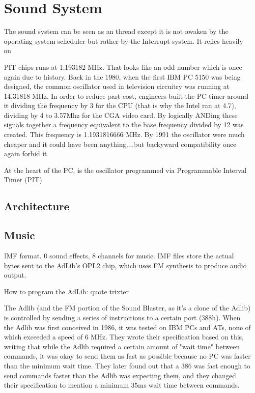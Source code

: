 \section{Sound System}
The sound system can be seen as an thread except it is not awaken by the operating system scheduler but rather by the Interrupt system. It relies heavily on 
\par
PIT chips runs at 1.193182 MHz. That looks like an odd number which is once again due to history. Back in the 1980, when the first IBM PC 5150 was being designed, the common oscillator used in television circuitry was running at 14.31818 MHz. In order to reduce part cost, engineers built the PC timer around it dividing the frequency by 3 for the CPU (that is why the Intel ran at 4.7), dividing by 4 to 3.57Mhz for the CGA video card. By logically ANDing these signals together a frequency equivalent to the base frequency divided by 12 was created. This frequency is 1.1931816666 MHz. By 1991 the oscillator were much cheaper and it could have been anything....but backyward compatibility once again forbid it.\\
\par
At the heart of the PC, is the oscillator programmed via Programmable Interval Timer (PIT).\\



\subsection{Architecture}




\subsection{Music}
IMF format. 0 sound effects, 8 channels for music. IMF files store the actual bytes sent to the AdLib's OPL2 chip, which uses FM synthesis to produce audio output.

How to program the AdLib: quote trixter

The Adlib (and the FM portion of the Sound Blaster, as it's a clone of the Adlib) is controlled by sending a series of instructions to a certain port (388h). When the Adlib was first conceived in 1986, it was tested on IBM PCs and ATs, none of which exceeded a speed of 6 MHz. They wrote their specification based on this, writing that while the Adlib required a certain amount of "wait time" between commands, it was okay to send them as fast as possible because no PC was faster than the minimum wait time. They later found out that a 386 was fast enough to send commands faster than the Adlib was expecting them, and they changed their specification to mention a minimum 35ms wait time between commands.

